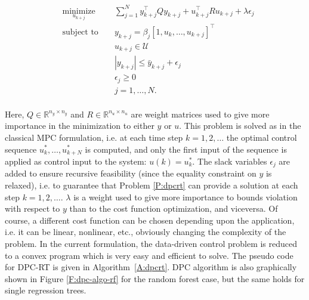 \begin{problem}\label{P:dpcrt}
	\begin{equation}
	\begin{aligned}
	& \underset{u_{k+j}}{\text{minimize}} & & \sum_{j=1}^{N} y^\top_{k+j} Q y_{k+j} + u^\top_{k+j} R u_{k+j} + \lambda\epsilon_j \\
	& \text{subject to }                  & & y_{k+j}     =   \beta_j [1,u_{k},\ldots,u_{k+j} ]^\top                             \\
	&                                     & & u_{k+j}    \in  \mathcal{U}                                                        \\
	&                                     & & |y_{k+j}|  \leq \bar{y}_{k+j} + \epsilon_j 										 \\
	&                                     & & \epsilon_j \geq  0							                                     \\
	&                                     & & j           =    1,\ldots,N.            									         \\
	\end{aligned}
	\label{E:dpcrt}
	\end{equation}
\end{problem}

\textcolor[rgb]{0,0,1}{Here, $Q \in \mathbb{R}^{n_y\times n_y}$ and $R \in \mathbb{R}^{n_u\times n_u}$ are weight matrices used to give more importance in the minimization to either $y$ or $u$.
This problem is solved as in the classical MPC formulation, i.e. at each time step $k=1,2,\ldots$ the optimal control sequence $u^*_k,\ldots,u^*_{k+N}$ is computed, and only the first input of the sequence is applied as control input to the system: $u(k) = u^*_k$.
The slack variables $\epsilon_j$ are added to ensure recursive feasibility (since the equality constraint on $y$ is relaxed), i.e. to guarantee that Problem \ref{P:dpcrt} can provide a solution at each step $k=1,2,\ldots$.
$\lambda$ is a weight used to give more importance to bounds violation with respect to $y$ than to the cost function optimization, and viceversa. 
Of course, a different cost function can be chosen depending upon the application, i.e. it can be linear, nonlinear, etc., obviously changing the complexity of the problem.
In the current formulation, the data-driven control problem is reduced to a convex program which is very easy and efficient to solve.}
The pseudo code for DPC-RT is given in Algorithm~\ref{A:dpcrt}.
\textcolor[rgb]{0,0,1}{DPC algorithm is also graphically shown in Figure \ref{F:dpc-algo-rf} for the random forest case, but the same holds for single regression trees.}

